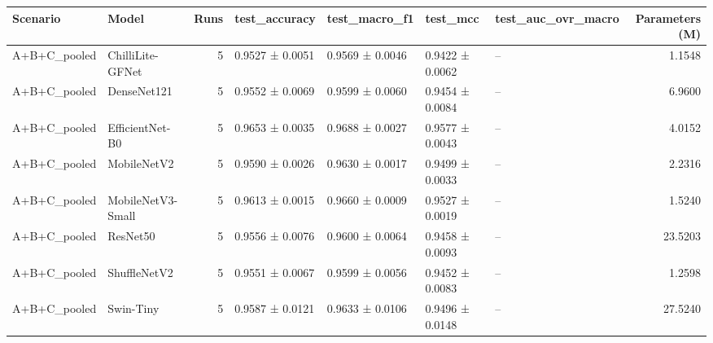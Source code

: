 \begin{tabular}{llrllllr}
\toprule
Scenario & Model & Runs & test\_accuracy & test\_macro\_f1 & test\_mcc & test\_auc\_ovr\_macro & Parameters (M) \\
\midrule
A+B+C\_pooled & ChilliLite-GFNet & 5 & 0.9527 ± 0.0051 & 0.9569 ± 0.0046 & 0.9422 ± 0.0062 & -- & 1.1548 \\
A+B+C\_pooled & DenseNet121 & 5 & 0.9552 ± 0.0069 & 0.9599 ± 0.0060 & 0.9454 ± 0.0084 & -- & 6.9600 \\
A+B+C\_pooled & EfficientNet-B0 & 5 & 0.9653 ± 0.0035 & 0.9688 ± 0.0027 & 0.9577 ± 0.0043 & -- & 4.0152 \\
A+B+C\_pooled & MobileNetV2 & 5 & 0.9590 ± 0.0026 & 0.9630 ± 0.0017 & 0.9499 ± 0.0033 & -- & 2.2316 \\
A+B+C\_pooled & MobileNetV3-Small & 5 & 0.9613 ± 0.0015 & 0.9660 ± 0.0009 & 0.9527 ± 0.0019 & -- & 1.5240 \\
A+B+C\_pooled & ResNet50 & 5 & 0.9556 ± 0.0076 & 0.9600 ± 0.0064 & 0.9458 ± 0.0093 & -- & 23.5203 \\
A+B+C\_pooled & ShuffleNetV2 & 5 & 0.9551 ± 0.0067 & 0.9599 ± 0.0056 & 0.9452 ± 0.0083 & -- & 1.2598 \\
A+B+C\_pooled & Swin-Tiny & 5 & 0.9587 ± 0.0121 & 0.9633 ± 0.0106 & 0.9496 ± 0.0148 & -- & 27.5240 \\
\bottomrule
\end{tabular}

